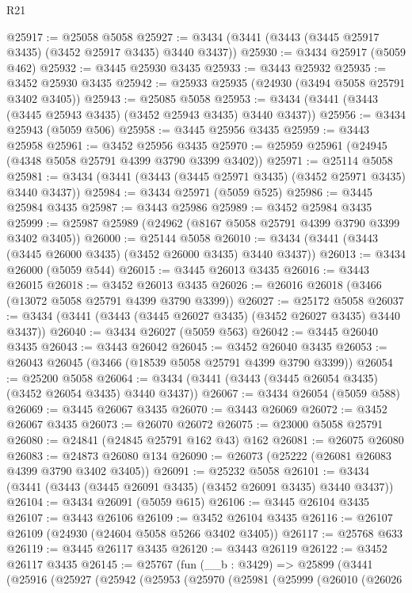 \begin{lexlean}{R21}
\begin{coremodule}
@25917 := @25058 @5058
@25927 := @3434 (@3441 (@3443 (@3445 @25917 @3435) (@3452 @25917 @3435) @3440 @3437))
@25930 := @3434 @25917 (@5059 @462)
@25932 := @3445 @25930 @3435
@25933 := @3443 @25932
@25935 := @3452 @25930 @3435
@25942 := @25933 @25935 (@24930 (@3494 @5058 @25791 @3402 @3405))
@25943 := @25085 @5058
@25953 := @3434 (@3441 (@3443 (@3445 @25943 @3435) (@3452 @25943 @3435) @3440 @3437))
@25956 := @3434 @25943 (@5059 @506)
@25958 := @3445 @25956 @3435
@25959 := @3443 @25958
@25961 := @3452 @25956 @3435
@25970 := @25959 @25961 (@24945 (@4348 @5058 @25791 @4399 @3790 @3399 @3402))
@25971 := @25114 @5058
@25981 := @3434 (@3441 (@3443 (@3445 @25971 @3435) (@3452 @25971 @3435) @3440 @3437))
@25984 := @3434 @25971 (@5059 @525)
@25986 := @3445 @25984 @3435
@25987 := @3443 @25986
@25989 := @3452 @25984 @3435
@25999 := @25987 @25989 (@24962 (@8167 @5058 @25791 @4399 @3790 @3399 @3402 @3405))
@26000 := @25144 @5058
@26010 := @3434 (@3441 (@3443 (@3445 @26000 @3435) (@3452 @26000 @3435) @3440 @3437))
@26013 := @3434 @26000 (@5059 @544)
@26015 := @3445 @26013 @3435
@26016 := @3443 @26015
@26018 := @3452 @26013 @3435
@26026 := @26016 @26018 (@3466 (@13072 @5058 @25791 @4399 @3790 @3399))
@26027 := @25172 @5058
@26037 := @3434 (@3441 (@3443 (@3445 @26027 @3435) (@3452 @26027 @3435) @3440 @3437))
@26040 := @3434 @26027 (@5059 @563)
@26042 := @3445 @26040 @3435
@26043 := @3443 @26042
@26045 := @3452 @26040 @3435
@26053 := @26043 @26045 (@3466 (@18539 @5058 @25791 @4399 @3790 @3399))
@26054 := @25200 @5058
@26064 := @3434 (@3441 (@3443 (@3445 @26054 @3435) (@3452 @26054 @3435) @3440 @3437))
@26067 := @3434 @26054 (@5059 @588)
@26069 := @3445 @26067 @3435
@26070 := @3443 @26069
@26072 := @3452 @26067 @3435
@26073 := @26070 @26072
@26075 := @23000 @5058 @25791
@26080 := @24841 (@24845 @25791 @162 @43) @162
@26081 := @26075 @26080
@26083 := @24873 @26080 @134
@26090 := @26073 (@25222 (@26081 @26083 @4399 @3790 @3402 @3405))
@26091 := @25232 @5058
@26101 := @3434 (@3441 (@3443 (@3445 @26091 @3435) (@3452 @26091 @3435) @3440 @3437))
@26104 := @3434 @26091 (@5059 @615)
@26106 := @3445 @26104 @3435
@26107 := @3443 @26106
@26109 := @3452 @26104 @3435
@26116 := @26107 @26109 (@24930 (@24604 @5058 @5266 @3402 @3405))
@26117 := @25768 @633
@26119 := @3445 @26117 @3435
@26120 := @3443 @26119
@26122 := @3452 @26117 @3435
@26145 := @25767
    (fun (__b : @3429) =>
    @25899
      (@3441
        (@25916
          (@25927
            (@25942
              (@25953
                (@25970
                  (@25981
                    (@25999
                      (@26010
                        (@26026

\end{coremodule}
\end{lexlean}
